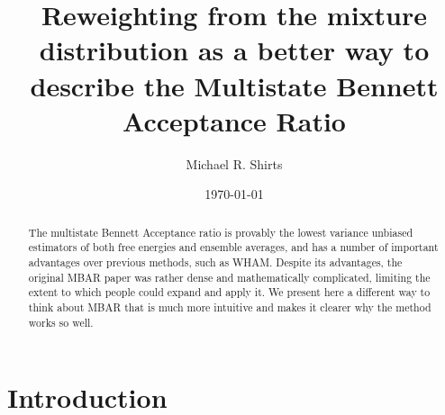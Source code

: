 \documentclass[aps,pre,twocolumn,superscriptaddress]{revtex4-1}
\begin{document}

\title{Reweighting from the mixture distribution as a better way to describe the Multistate Bennett Acceptance Ratio}

 \author{Michael R. Shirts}

\begin{abstract}The multistate Bennett Acceptance ratio is provably the
  lowest variance unbiased estimators of both free energies and
  ensemble averages, and has a number of important advantages over
  previous methods, such as WHAM. Despite its advantages, the original
  MBAR paper was rather dense and mathematically complicated, limiting
  the extent to which people could expand and apply it. We present
  here a different way to think about MBAR that is much more intuitive
  and makes it clearer why the method works so well.
\end{abstract}
\date{\today} 

\maketitle



\section{Introduction}
\end{document}
